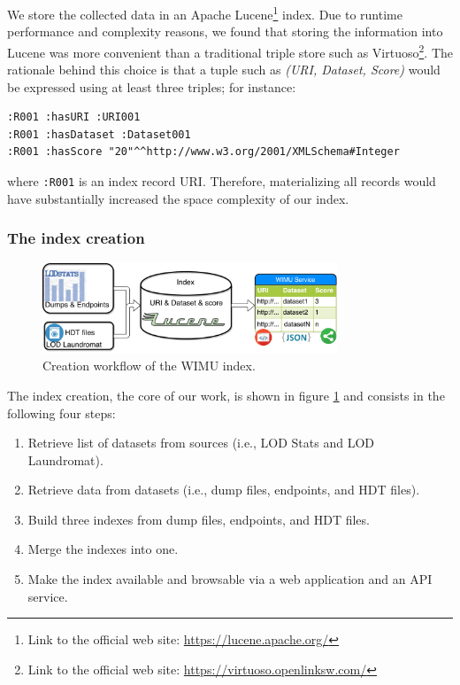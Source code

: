 We store the collected data in an Apache Lucene\footnote{Link to the official web site: \url{https://lucene.apache.org/}} index.
Due to runtime performance and complexity reasons, we found that storing the information into Lucene was more convenient than a traditional triple store such as Virtuoso\footnote{Link to the official web site: \url{https://virtuoso.openlinksw.com/}}.
The rationale behind this choice is that a tuple such as \emph{(URI, Dataset, Score)} would be expressed using at least three triples; for instance:
\begin{verbatim}
:R001 :hasURI :URI001
:R001 :hasDataset :Dataset001
:R001 :hasScore "20"^^http://www.w3.org/2001/XMLSchema#Integer
\end{verbatim}
where \texttt{:R001} is an index record URI. Therefore, materializing all records would have substantially increased the space complexity of our index.

\subsubsection{The index creation}

\begin{figure}[htb] 
	\centering
	\includegraphics[width=250pt]{img/arq.pdf}
	\caption{Creation workflow of the WIMU index.}
	\label{fig:flow1}
\end{figure}

The index creation, the core of our work, is shown in figure \ref{fig:flow1} and consists in the following four steps:
\begin{enumerate}		
	\item Retrieve list of datasets from sources (i.e., LOD Stats and LOD Laundromat).
	\item Retrieve data from datasets (i.e., dump files, endpoints, and HDT files).
	\item Build three indexes from dump files, endpoints, and HDT files.
	\item Merge the indexes into one.
	\item Make the index available and browsable via a web application and an API service.
\end{enumerate}

